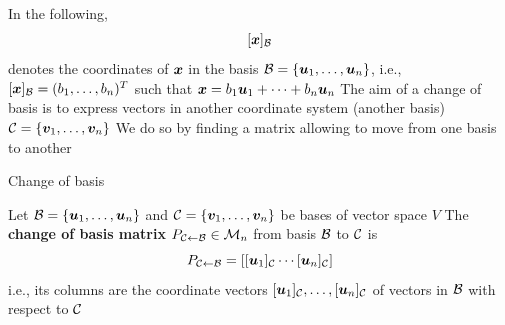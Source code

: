 \documentclass[aspectratio=169]{beamer}\usepackage[]{graphicx}\usepackage[]{xcolor}
\begin{document}


\begin{frame}
	In the following, 
	\[
	[\bm{x}]_{\mathcal{B}}
	\]
	denotes the coordinates of $\bm{x}$ in the basis $\mathcal{B}=\{\bm{u}_1,\ldots,\bm{u}_n\}$, i.e., $[\bm{x}]_{\mathcal{B}}=(b_1,\ldots,b_n)^T$ such that $\bm{x} = b_1\bm{u}_1+\cdots+b_n\bm{u}_n$
	\vfill
	The aim of a change of basis is to express vectors in another coordinate system (another basis) $\mathcal{C}=\{\bm{v}_1,\ldots,\bm{v}_n\}$
	\vfill
	We do so by finding a matrix allowing to move from one basis to another
\end{frame}

\begin{frame}{Change of basis}
\begin{definition}
Let $\mathcal{B}=\{\bm{u}_1,\ldots,\bm{u}_n\}$ and $\mathcal{C}=\{\bm{v}_1,\ldots,\bm{v}_n\}$ be bases of vector space $V$
\vskip0.5cm
The \textbf{change of basis matrix} $P_{\mathcal{C}\leftarrow\mathcal{B}}\in\mathcal{M}_n$ from basis $\mathcal{B}$ to $\mathcal{C}$ is
\[
P_{\mathcal{C}\leftarrow\mathcal{B}}
=\left[
[\bm{u}_1]_{\mathcal{C}} \cdots [\bm{u}_n]_{\mathcal{C}}
\right]
\]
i.e., its columns are the coordinate vectors $[\bm{u}_1]_{\mathcal{C}},\ldots,[\bm{u}_n]_{\mathcal{C}}$ of vectors in $\mathcal{B}$ with respect to $\mathcal{C}$
\end{definition}
\end{frame}
\end{document}
